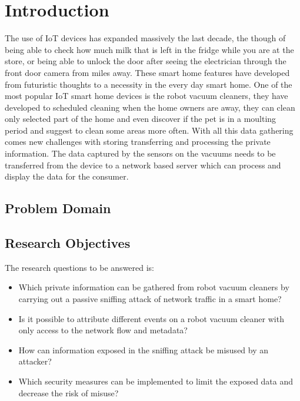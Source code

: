 \chapter{Introduction}

The use of IoT devices has expanded massively the last decade, the though of being able to check how much milk that is left in the fridge while you are at the store, or being able to unlock the door after seeing the electrician through the front door camera from miles away. These smart home features have developed from futuristic thoughts to a necessity in the every day smart home. One of the most popular IoT smart home devices is the robot vacuum cleaners, they have developed to scheduled cleaning when the home owners are away, they can clean only selected part of the home and even discover if the pet is in a moulting period and suggest to clean some areas more often. With all this data gathering comes new challenges with storing transferring and processing the private information. The data captured by the sensors on the vacuums needs to be transferred from the device to a network based server which can process and display the data for the consumer. 


\section{Problem Domain}

\section{Research Objectives}
 The research questions to be answered is: 
\begin{itemize}
    \item Which private information can be gathered from robot vacuum cleaners by carrying out a passive sniffing attack of network traffic in a smart home?
    \item Is it possible to attribute different events on a robot vacuum cleaner with only access to the network flow and metadata?
    \item How can information exposed in the sniffing attack be misused by an attacker?
    \item Which security measures can be implemented to limit the exposed data and decrease the risk of misuse? 
\end{itemize}


